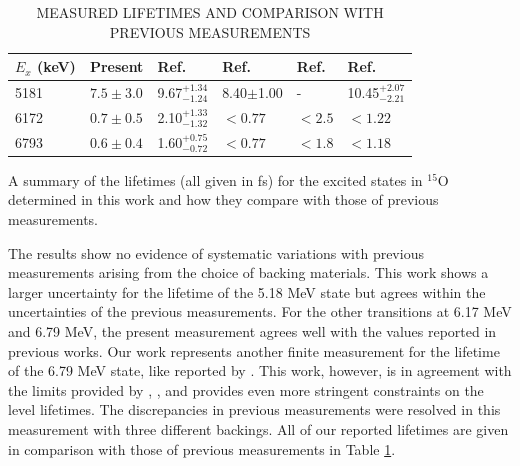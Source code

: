 \begin{table}[]
\caption{MEASURED LIFETIMES AND COMPARISON WITH PREVIOUS MEASUREMENTS}
\begin{center}
\begin{threeparttable}
\begin{tabular}{llllll}
\toprule
$E_{x}$ (keV) & Present       & Ref. \cite{Bertone2001}  & Ref. \cite{Schurmann2008} & Ref. \cite{Galinski2014} & Ref. \cite{Sharma2020} \\
\midrule
5181          & $7.5 \pm 3.0$ & 9.67$^{+1.34}_{-1.24}$ & 8.40$\pm$1.00            & -  & 10.45$^{+2.07}_{-2.21}$                      \\
6172          & $0.7 \pm 0.5$ & 2.10$^{+1.33}_{-1.32}$  & $< 0.77$                 & $< 2.5$   & $< 1.22$              \\
6793          & $0.6 \pm 0.4$ & 1.60$^{+0.75}_{-0.72}$  & $< 0.77$                 & $< 1.8$  & $< 1.18$        \\ \bottomrule
\end{tabular}
\begin{tablenotes}
\small 
\item A summary of the lifetimes (all given in fs) for the excited states in $^{15}$O determined in this work and how they compare with those of previous measurements. 
\end{tablenotes}
\end{threeparttable}
\label{table: lifetimesSummary}
\end{center}
\end{table}

The results show no evidence of systematic variations with previous measurements arising from the choice of backing materials. This work shows a larger uncertainty for the lifetime of the 5.18 MeV state but agrees within the uncertainties of the previous measurements. For the other transitions at 6.17 MeV and 6.79 MeV, the present measurement agrees well with the values reported in previous works. Our work represents another finite measurement for the lifetime of the 6.79 MeV state, like reported by \citet{Bertone2001}. This work, however, is in agreement with the limits provided by \citet{Schurmann2008}, \citet{Galinski2014}, \citet{Sharma2020} and provides even more stringent constraints on the level lifetimes. The discrepancies in previous measurements were resolved in this measurement with three different backings. All of our reported lifetimes are given in comparison with those of previous measurements in Table \ref{table: lifetimesSummary}.



%
% 
% 
